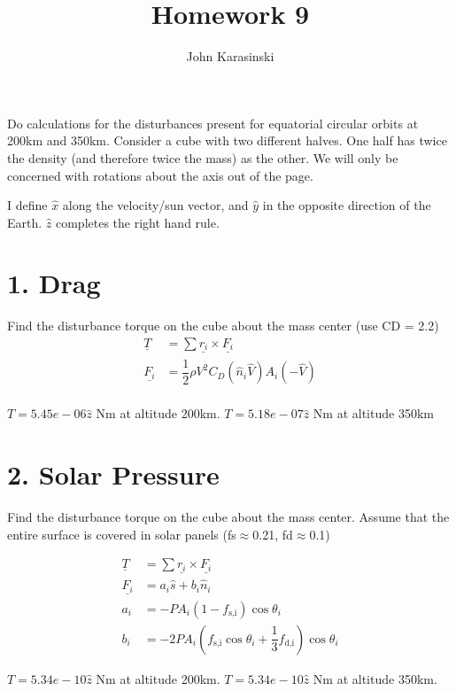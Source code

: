 \documentclass[onecolumn,10pt]{jhwhw}
\author{John Karasinski}
\title{Homework 9}
\begin{document}

Do calculations for the disturbances present for equatorial circular orbits at 200km and 350km. Consider a cube with two different halves. One half has twice the density (and therefore twice the mass) as the other. We will only be concerned with rotations about the axis out of the page.

I define $\hat{x}$ along the velocity/sun vector, and $\hat{y}$ in the opposite direction of the Earth. $\hat{z}$ completes the right hand rule.

\part{1. Drag}
Find the disturbance torque on the cube about the mass center (use CD = 2.2)
\begin{align*}
\underline{T} &= \sum \underline{r_i} \times \underline{F_i} \\
\underline{F_i} &= \dfrac{1}{2} \rho V^2 C_D \left( \hat{n}_i \hat{V} \right) A_i \left( - \hat{V} \right) \\
\end{align*}

$T = 5.45e-06 \hat{z}$ Nm at altitude 200km. $T = 5.18e-07 \hat{z}$ Nm at altitude 350km

\part{2. Solar Pressure}
Find the disturbance torque on the cube about the mass center. Assume that the entire surface is covered in solar panels (fs$\approx$0.21, fd$\approx$0.1)

\begin{align*}
\underline{T} &= \sum \underline{r_i} \times \underline{F_i} \\
\underline{F_i} &= a_i \hat{s} + b_i \hat{n}_i \\
a_i &= -PA_i \left(1-f_{\mbox{s,i}} \right) \cos{\theta_i} \\
b_i &= -2PA_i \left(f_{\mbox{s,i}} \cos{\theta_i} + \dfrac{1}{3} f_{\mbox{d,i}} \right) \cos{\theta_i}
\end{align*}

$T = 5.34e-10 \hat{z}$ Nm at altitude 200km. $T = 5.34e-10 \hat{z}$ Nm at altitude 350km.
\end{document}
